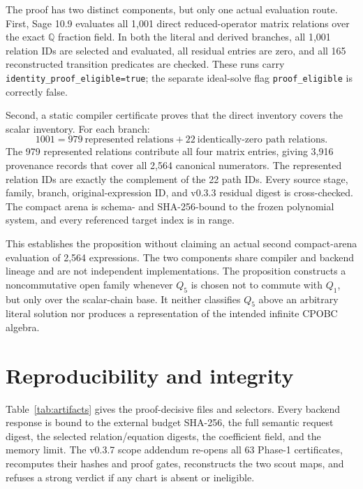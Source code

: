 \documentclass[11pt]{article}
\theoremstyle{remark}
\theoremstyle{plain}
\newcommand{\QQ}{\mathbb{Q}}
\newcommand{\artifact}[1]{\texttt{\small #1}}
\begin{document}
The proof has two distinct components, but only one actual evaluation
route.  First, Sage 10.9 evaluates all 1,001 direct reduced-operator
matrix relations over the exact \(\QQ\) fraction field.  In both the
literal and derived branches, all 1,001 relation IDs are selected and
evaluated, all residual entries are zero, and all 165 reconstructed
transition predicates are checked.  These runs carry
\artifact{identity\_proof\_eligible=true}; the separate ideal-solve flag
\artifact{proof\_eligible} is correctly false.

Second, a static compiler certificate proves that the direct inventory
covers the scalar inventory.  For each branch:
\[
  1001 = 979\ \text{represented relations}
       + 22\ \text{identically-zero path relations}.
\]
The 979 represented relations contribute all four matrix entries, giving
3,916 provenance records that cover all 2,564 canonical numerators.
The represented relation IDs are exactly the complement of the 22 path
IDs.  Every source stage, family, branch, original-expression ID, and
v0.3.3 residual digest is cross-checked.  The compact arena is schema- and
SHA-256-bound to the frozen polynomial system, and every referenced target
index is in range.

This establishes the proposition without claiming an actual second
compact-arena evaluation of 2,564 expressions.  The two components share
compiler and backend lineage and are not independent implementations.
The proposition constructs a noncommutative open family whenever \(Q_5\)
is chosen not to commute with \(Q_1\), but only over the scalar-chain base.
It neither classifies \(Q_5\) above an arbitrary literal solution nor
produces a representation of the intended infinite CPOBC algebra.

\section{Reproducibility and integrity}

Table~\ref{tab:artifacts} gives the proof-decisive files and selectors.
Every backend response is bound to the external budget SHA-256, the full
semantic request digest, the selected relation/equation digests, the
coefficient field, and the memory limit.  The v0.3.7 scope addendum
re-opens all 63 Phase-1 certificates, recomputes their hashes and proof
gates, reconstructs the two scout maps, and refuses a strong verdict if
any chart is absent or ineligible.
\end{document}
